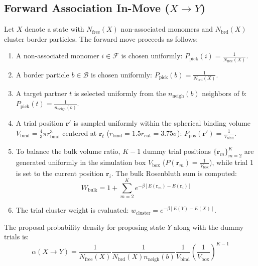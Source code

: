 \documentclass[11pt,a4paper]{article}
\begin{document}
\subsection{Forward Association In-Move \texorpdfstring{($X \to Y$)}{X -> Y}}
Let $X$ denote a state with $N_{\text{free}}(X)$ non-associated monomers and $N_{\text{brd}}(X)$ cluster border particles. The forward move proceeds as follows:
\begin{enumerate}
    \item A non-associated monomer $i \in \mathcal{F}$ is chosen uniformly: $P_{\text{pick}}(i) = \frac{1}{N_{\text{free}}(X)}$.
    \item A border particle $b \in \mathcal{B}$ is chosen uniformly: $P_{\text{pick}}(b) = \frac{1}{N_{\text{brd}}(X)}$.
    \item A target partner $t$ is selected uniformly from the $n_{\text{neigh}}(b)$ neighbors of $b$: $P_{\text{pick}}(t) = \frac{1}{n_{\text{neigh}}(b)}$.
    \item A trial position $\mathbf{r}'$ is sampled uniformly within the spherical binding volume $V_{\text{bind}} = \frac{4}{3}\pi r_{\text{bind}}^3$ centered at $\mathbf{r}_t$ ($r_{\text{bind}} = 1.5 r_{\text{cut}} = 3.75\sigma$): $P_{\text{pos}}(\mathbf{r}') = \frac{1}{V_{\text{bind}}}$.
    \item To balance the bulk volume ratio, $K-1$ dummy trial positions $\{\mathbf{r}_m\}_{m=2}^K$ are generated uniformly in the simulation box $V_{\text{box}}$ ($P(\mathbf{r}_m) = \frac{1}{V_{\text{box}}}$), while trial 1 is set to the current position $\mathbf{r}_i$. The bulk Rosenbluth sum is computed:
    \begin{equation}
    W_{\text{bulk}} = 1 + \sum_{m=2}^K e^{-\beta [E(\mathbf{r}_m) - E(\mathbf{r}_i)]}
    \end{equation}
    \item The trial cluster weight is evaluated: $w_{\text{cluster}} = e^{-\beta [E(Y) - E(X)]}$.
\end{enumerate}

The proposal probability density for proposing state $Y$ along with the dummy trials is:
\begin{equation}
\alpha(X \to Y) = \frac{1}{N_{\text{free}}(X)} \frac{1}{N_{\text{brd}}(X) n_{\text{neigh}}(b)} \frac{1}{V_{\text{bind}}} \left(\frac{1}{V_{\text{box}}}\right)^{K-1}
\end{equation}
\end{document}
